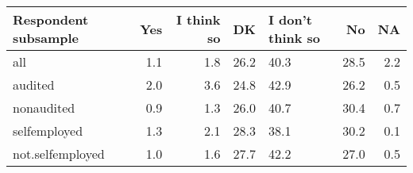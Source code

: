 \begin{table}[ht]
\centering
\begin{tabular}{lrrrL{2cm}rr}
  \hline
Respondent subsample & Yes & I think so & DK & I don't think so & No & NA \\ 
  \hline
all & 1.1 & 1.8 & 26.2 & 40.3 & 28.5 & 2.2 \\ 
  audited & 2.0 & 3.6 & 24.8 & 42.9 & 26.2 & 0.5 \\ 
  nonaudited & 0.9 & 1.3 & 26.0 & 40.7 & 30.4 & 0.7 \\ 
  selfemployed & 1.3 & 2.1 & 28.3 & 38.1 & 30.2 & 0.1 \\ 
  not.selfemployed & 1.0 & 1.6 & 27.7 & 42.2 & 27.0 & 0.5 \\ 
   \hline
\end{tabular}
\end{table}
